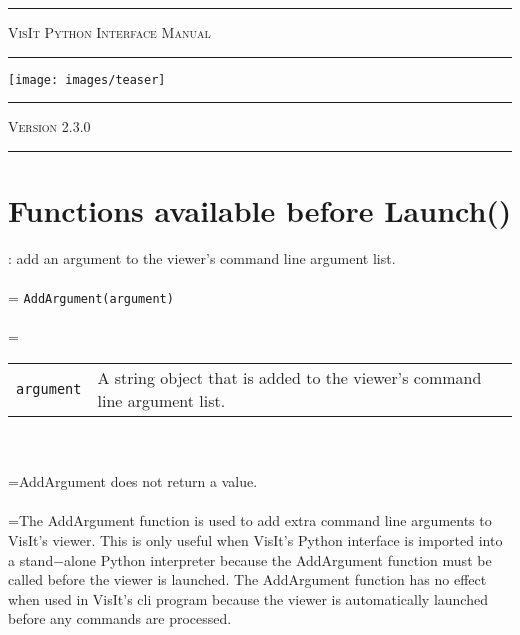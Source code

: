\documentclass[10pt,a4paper]{report}
\begin{document}
\begin{titlepage}
\begin{center}
\hrule
\textsc{\huge VisIt Python Interface Manual}\\[0.5cm]
\hrule
\texttt{[image: images/teaser]}\\[0.5cm]
\hrule
\textsc{\LARGE Version 2.3.0}\\[0.5cm]
\hrule

\date{}
\end{center}
\end{titlepage}

\tableofcontents
\newpage
{}





\chapter{Functions available before Launch()}


{}
: add an argument to the viewer's command line argument list.\\[-3mm]

 \\ 
\hangindent=\parindent 
\verb!AddArgument(argument)!\\ [-3mm]

 \\ 
\hangindent=\parindent 
\begin{tabular}{lp{9cm}}
\verb!argument! & A string object that is added to the viewer's command line argument list. \\
\end{tabular} \\[-2mm]


 \\ 
\hangindent=\parindent AddArgument does not return a value. \\[-3mm] 

 \\ 
\hangindent=\parindent The AddArgument function is used to add extra command line arguments to VisIt's viewer. This is only useful when VisIt's Python interface is imported into a stand$-$alone Python interpreter because the AddArgument function must be called before the viewer is launched. The AddArgument function has no effect when used in VisIt's cli program because the viewer is automatically launched before any commands are processed. \\[-3mm] 
\end{document}
